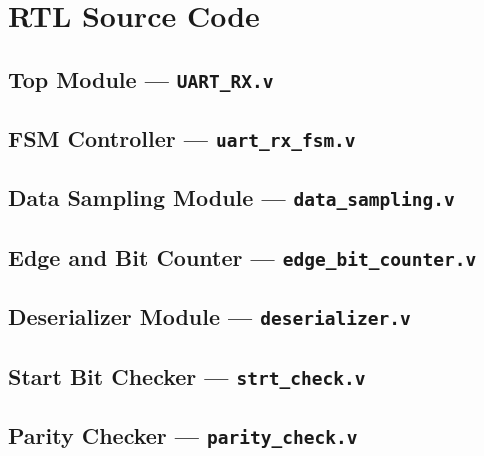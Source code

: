 \documentclass[12pt,a4paper]{article}
\begin{document}
\section{RTL Source Code}

\subsection{Top Module — \texttt{UART\_RX.v}}


\subsection{FSM Controller — \texttt{uart\_rx\_fsm.v}}


\subsection{Data Sampling Module — \texttt{data\_sampling.v}}


\subsection{Edge and Bit Counter — \texttt{edge\_bit\_counter.v}}


\subsection{Deserializer Module — \texttt{deserializer.v}}


\subsection{Start Bit Checker — \texttt{strt\_check.v}}


\subsection{Parity Checker — \texttt{parity\_check.v}}

\end{document}
